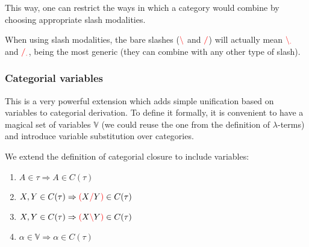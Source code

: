 \documentclass[main.tex]{subfiles}
\begin{document}
This way, one can restrict the ways in which a category would
combine by choosing appropriate slash modalities.

When using slash modalities, the bare slashes ($\textcolor{red}{\backslash}$ and $\textcolor{red}{/}$) will actually
mean $\textcolor{red}{\backslash_{.}}$ and $\textcolor{red}{/_{.}}$, being the most generic (they
can combine with any other type of slash).


\subsubsection{Categorial variables}
This is a very powerful extension which adds simple unification based on variables
to categorial derivation. To define it formally, it is convenient to have a
magical set of variables $\mathbb{V}$ (we could reuse the one from the definition
of $\lambda$-terms)
and introduce variable substitution over categories.

\begin{defn}
    We extend the definition of categorial closure to include variables:
    \begin{enumerate}
        \item \label{cvar:atomic} $A \in \tau \Rightarrow A \in C(\tau)$
        \item \label{cvar:right}  $X, Y \in C(\tau) \Rightarrow \textcolor{red}{(} X \textcolor{red}{/} Y \textcolor{red}{)} \in C(\tau)$
        \item \label{cvar:left}   $X, Y \in C(\tau) \Rightarrow \textcolor{red}{(} X \textcolor{red}{\backslash} Y \textcolor{red}{)} \in C(\tau)$
        \item \label{cvar:var}    $\alpha \in \mathbb{V} \Rightarrow \alpha \in C(\tau)$
    \end{enumerate}
\end{defn}
\end{document}
